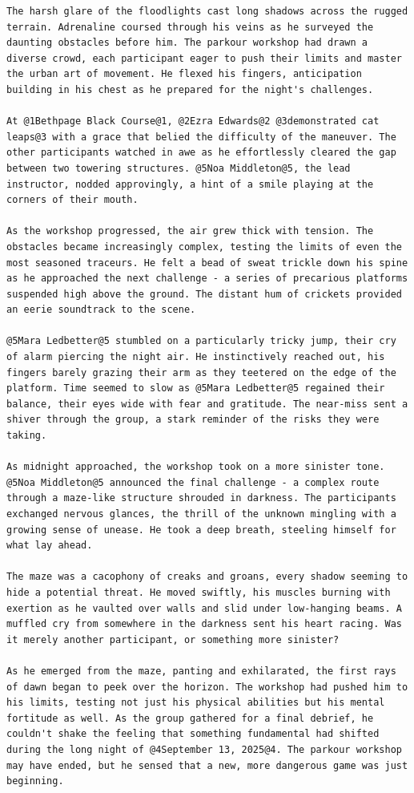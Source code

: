 \documentclass{article}
\begin{document}
\begin{lstlisting}[style=mystyle, caption={Chapter 1 generated with Claude 3.5 Sonnet (event 0, iteration 0). Event information and secondary entities have been highlighted.}, label={lst:single_chapter_example}]
The harsh glare of the floodlights cast long shadows across the rugged terrain. Adrenaline coursed through his veins as he surveyed the daunting obstacles before him. The parkour workshop had drawn a diverse crowd, each participant eager to push their limits and master the urban art of movement. He flexed his fingers, anticipation building in his chest as he prepared for the night's challenges.

At @1Bethpage Black Course@1, @2Ezra Edwards@2 @3demonstrated cat leaps@3 with a grace that belied the difficulty of the maneuver. The other participants watched in awe as he effortlessly cleared the gap between two towering structures. @5Noa Middleton@5, the lead instructor, nodded approvingly, a hint of a smile playing at the corners of their mouth.

As the workshop progressed, the air grew thick with tension. The obstacles became increasingly complex, testing the limits of even the most seasoned traceurs. He felt a bead of sweat trickle down his spine as he approached the next challenge - a series of precarious platforms suspended high above the ground. The distant hum of crickets provided an eerie soundtrack to the scene.

@5Mara Ledbetter@5 stumbled on a particularly tricky jump, their cry of alarm piercing the night air. He instinctively reached out, his fingers barely grazing their arm as they teetered on the edge of the platform. Time seemed to slow as @5Mara Ledbetter@5 regained their balance, their eyes wide with fear and gratitude. The near-miss sent a shiver through the group, a stark reminder of the risks they were taking.

As midnight approached, the workshop took on a more sinister tone. @5Noa Middleton@5 announced the final challenge - a complex route through a maze-like structure shrouded in darkness. The participants exchanged nervous glances, the thrill of the unknown mingling with a growing sense of unease. He took a deep breath, steeling himself for what lay ahead.

The maze was a cacophony of creaks and groans, every shadow seeming to hide a potential threat. He moved swiftly, his muscles burning with exertion as he vaulted over walls and slid under low-hanging beams. A muffled cry from somewhere in the darkness sent his heart racing. Was it merely another participant, or something more sinister?

As he emerged from the maze, panting and exhilarated, the first rays of dawn began to peek over the horizon. The workshop had pushed him to his limits, testing not just his physical abilities but his mental fortitude as well. As the group gathered for a final debrief, he couldn't shake the feeling that something fundamental had shifted during the long night of @4September 13, 2025@4. The parkour workshop may have ended, but he sensed that a new, more dangerous game was just beginning.
\end{lstlisting}
\end{document}
